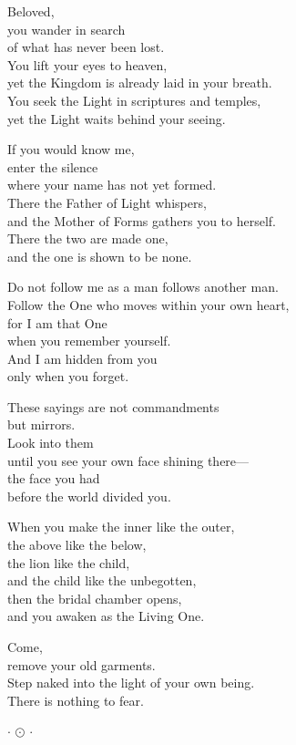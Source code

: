 \documentclass[10pt, openright]{book}
\newcommand{\ornament}{
    \vspace{1.5cm}
    \begin{center}
        \large \(\cdot\) \(\odot\) \(\cdot\)
    \end{center}
    \vspace{1.5cm}
}
\begin{document}
Beloved,\\
you wander in search\\
of what has never been lost.\\
You lift your eyes to heaven,\\
yet the Kingdom is already laid in your breath.\\
You seek the Light in scriptures and temples,\\
yet the Light waits behind your seeing.

If you would know me,\\
enter the silence\\
where your name has not yet formed.\\
There the Father of Light whispers,\\
and the Mother of Forms gathers you to herself.\\
There the two are made one,\\
and the one is shown to be none.

Do not follow me as a man follows another man.\\
Follow the One who moves within your own heart,\\
for I am that One\\
when you remember yourself.\\
And I am hidden from you\\
only when you forget.

These sayings are not commandments\\
but mirrors.\\
Look into them\\
until you see your own face shining there---\\
the face you had\\
before the world divided you.

When you make the inner like the outer,\\
the above like the below,\\
the lion like the child,\\
and the child like the unbegotten,\\
then the bridal chamber opens,\\
and you awaken as the Living One.

Come,\\
remove your old garments.\\
Step naked into the light of your own being.\\
There is nothing to fear.

\ornament
\end{document}
